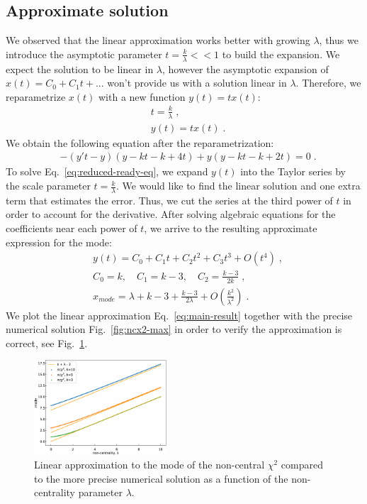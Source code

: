 \documentclass{amsart}
\numberwithin{equation}{section}
\begin{document}
\subsection{Approximate solution}
We observed that the linear approximation works better with growing $\lambda$, thus we introduce the asymptotic parameter $t = \frac{k}{\lambda} << 1$ to build the expansion. We expect the solution to be linear in $\lambda$, however the asymptotic expansion of $x(t) = C_0 + C_1 t + ...$ won't provide us with a solution linear in $\lambda$. Therefore, we reparametrize $x(t)$ with a new function $y(t) = t x(t)$:
%
\begin{align}
    &t = \frac{k}{\lambda}\;,\label{eq:asymp-scale} \\
    &y(t) = t x(t)\;.
\end{align}
%
We obtain the following equation after the reparametrization:
%
\begin{align}
   &-(y' t - y) (y - kt - k + 4t) + y (y - kt - k + 2t) = 0\label{eq:reduced-ready-eq}\;.
\end{align}
%
To solve Eq.~\ref{eq:reduced-ready-eq}, we expand $y(t)$ into the Taylor series by the scale parameter $t = \frac{k}{\lambda}$. We would like to find the linear solution and one extra term that estimates the error. Thus, we cut the series at the third power of $t$ in order to account for the derivative. After solving algebraic equations for the coefficients near each power of $t$, we arrive to the resulting approximate expression for the mode:
%
\begin{align}
    &y(t) = C_0 + C_1 t + C_2 t^2 + C_3 t^3 + O(t^4)\;, \\
    &C_0 = k, \quad C_1 = k-3, \quad C_2 = \frac{k-3}{2k}\;,\label{eq:taylor-coef-sols}\\
    &\boxed{x_{mode} = \lambda + k - 3 + \frac{k-3}{2 \lambda} + O\left(\frac{k^2}{\lambda^2}\right)} \label{eq:main-result}\;.
\end{align}
%
We plot the linear approximation Eq.~\ref{eq:main-result} together with the precise numerical solution Fig.~\ref{fig:ncx2-max} in order to verify the approximation is correct, see Fig.~\ref{fig:ncx2-vs-approx}.

\begin{figure}[h]
	\centering
 	\includegraphics[width=0.44\textwidth]{ncx2-vs-approx.eps}
	\caption{Linear approximation to the mode of the non-central $\chi^2$ compared to the more precise numerical solution as a function of the non-centrality parameter $\lambda$.}\label{fig:ncx2-vs-approx}
\end{figure}
\end{document}

